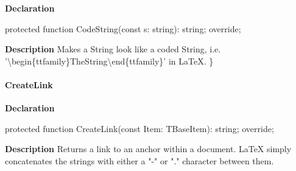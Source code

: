 \documentclass{report}
\newif\ifpdf
\begin{document}
\label{PasDoc_GenLatex.TTexDocGenerator-CodeString}
\begin{list}{}{
\setlength{\itemindent}{0cm}
\setlength{\listparindent}{0cm}
\setlength{\leftmargin}{\evensidemargin}
\addtolength{\leftmargin}{\tmplength}
\settowidth{\labelsep}{X}
\addtolength{\leftmargin}{\labelsep}
\setlength{\labelwidth}{\tmplength}
}
\item[\textbf{Declaration}\hfill]
\ifpdf
\begin{flushleft}
\fi
\begin{ttfamily}
protected function CodeString(const s: string): string; override;\end{ttfamily}

\ifpdf
\end{flushleft}
\fi

\par
\item[\textbf{Description}]
Makes a String look like a coded String, i.e. '{\textbackslash}begin{\{}ttfamily{\}}TheString{\textbackslash}end{\{}ttfamily{\}}' in LaTeX. {\}}

\end{list}
\paragraph*{CreateLink}\hspace*{\fill}

\label{PasDoc_GenLatex.TTexDocGenerator-CreateLink}
\begin{list}{}{
\setlength{\itemindent}{0cm}
\setlength{\listparindent}{0cm}
\setlength{\leftmargin}{\evensidemargin}
\addtolength{\leftmargin}{\tmplength}
\settowidth{\labelsep}{X}
\addtolength{\leftmargin}{\labelsep}
\setlength{\labelwidth}{\tmplength}
}
\item[\textbf{Declaration}\hfill]
\ifpdf
\begin{flushleft}
\fi
\begin{ttfamily}
protected function CreateLink(const Item: TBaseItem): string; override;\end{ttfamily}

\ifpdf
\end{flushleft}
\fi

\par
\item[\textbf{Description}]
Returns a link to an anchor within a document. LaTeX simply concatenates the strings with either a "{-}" or "." character between them.

\end{list}
\end{document}
